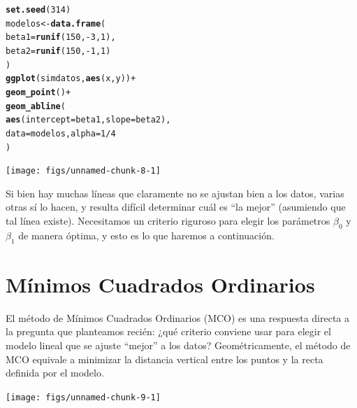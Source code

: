 \documentclass{report}\usepackage[]{graphicx}\usepackage[]{color}
\makeatletter
\newcommand{\hlnum}[1]{\textcolor[rgb]{0.686,0.059,0.569}{#1}}%
\newcommand{\hlopt}[1]{\textcolor[rgb]{0,0,0}{#1}}%
\newcommand{\hlstd}[1]{\textcolor[rgb]{0.345,0.345,0.345}{#1}}%
\newcommand{\hlkwb}[1]{\textcolor[rgb]{0.69,0.353,0.396}{#1}}%
\newcommand{\hlkwc}[1]{\textcolor[rgb]{0.333,0.667,0.333}{#1}}%
\newcommand{\hlkwd}[1]{\textcolor[rgb]{0.737,0.353,0.396}{\textbf{#1}}}%
\newenvironment{kframe}{%
 \def\at@end@of@kframe{}%
 \ifinner\ifhmode%
  \def\at@end@of@kframe{\end{minipage}}%
  \begin{minipage}{\columnwidth}%
 \fi\fi%
 \def\FrameCommand##1{\hskip\@totalleftmargin \hskip-\fboxsep
 \colorbox{shadecolor}{##1}\hskip-\fboxsep
     \hskip-\linewidth \hskip-\@totalleftmargin \hskip\columnwidth}%
 \MakeFramed {\advance\hsize-\width
   \@totalleftmargin\z@ \linewidth\hsize
   \@setminipage}}%
 {\par\unskip\endMakeFramed%
 \at@end@of@kframe}
\newenvironment{knitrout}{}{} %
\makeatother
\begin{document}
\begin{knitrout}
\color{fgcolor}\begin{kframe}
\begin{alltt}
\hlkwd{set.seed}\hlstd{(}\hlnum{314}\hlstd{)}
\hlstd{modelos} \hlkwb{<-} \hlkwd{data.frame}\hlstd{(}
  \hlkwc{beta1} \hlstd{=} \hlkwd{runif}\hlstd{(}\hlnum{150}\hlstd{,} \hlopt{-}\hlnum{3}\hlstd{,} \hlnum{1}\hlstd{),}
  \hlkwc{beta2} \hlstd{=} \hlkwd{runif}\hlstd{(}\hlnum{150}\hlstd{,} \hlopt{-}\hlnum{1}\hlstd{,} \hlnum{1}\hlstd{)}
\hlstd{)}
\hlkwd{ggplot}\hlstd{(simdatos,} \hlkwd{aes}\hlstd{(x, y))} \hlopt{+}
  \hlkwd{geom_point}\hlstd{()} \hlopt{+}
  \hlkwd{geom_abline}\hlstd{(}
    \hlkwd{aes}\hlstd{(}\hlkwc{intercept} \hlstd{= beta1,} \hlkwc{slope} \hlstd{= beta2),}
    \hlkwc{data} \hlstd{= modelos,} \hlkwc{alpha} \hlstd{=} \hlnum{1}\hlopt{/}\hlnum{4}
  \hlstd{)}
\end{alltt}
\end{kframe}

{\centering \texttt{[image: figs/unnamed-chunk-8-1]} 

}



\end{knitrout}

Si bien hay muchas líneas que claramente no se ajustan bien a los datos, varias otras sí lo hacen, y resulta difícil determinar cuál es ``la mejor'' (asumiendo que tal línea existe).
Necesitamos un criterio riguroso para elegir los parámetros $\beta_0$ y $\beta_1$ de manera óptima, y esto es lo que haremos a continuación.


\section{Mínimos Cuadrados Ordinarios}
\label{sec:MCO}

El método de Mínimos Cuadrados Ordinarios (MCO) es una respuesta directa a la pregunta que planteamos recién: ¿qué criterio conviene usar para elegir el modelo lineal que se ajuste ``mejor'' a los datos?
Geométricamente, el método de MCO equivale a minimizar la distancia vertical entre los puntos y la recta definida por el modelo.

\begin{knitrout}
\color{fgcolor}

{\centering \texttt{[image: figs/unnamed-chunk-9-1]} 

}



\end{knitrout}
\end{document}

